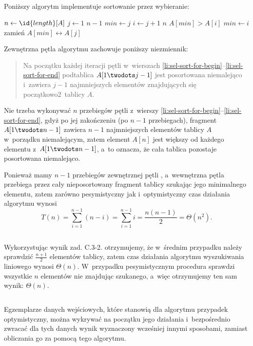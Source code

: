 \subsection{} %
Poniższy algorytm implementuje sortowanie przez wybieranie:
\begin{codebox}
\li	$n\gets \id{length}[A]$
\li	\For $j\gets 1$ \To $n-1$ \label{li:sel-sort-for-begin}
\li		\Do
			$min\gets j$
\li			\For $i\gets j+1$ \To $n$
\li				\Do
					\If $A[min]>A[i]$
\li						\Then
							$min\gets i$
						\End
				\End
\li			zamień $A[min]\leftrightarrow A[j]$
		\End \label{li:sel-sort-for-end}
\end{codebox}
Zewnętrzna pętla algorytmu zachowuje poniższy niezmiennik:
\begin{quote}
Na początku każdej iteracji pętli  w~wierszach \ref{li:sel-sort-for-begin}--\ref{li:sel-sort-for-end} podtablica $A[1\twodots j-1]$ jest posortowana niemalejąco i~zawiera $j-1$ najmniejszych elementów znajdujących się początkowo2~tablicy $A$.
\end{quote}

Nie trzeba wykonywać $n$ przebiegów pętli  z~wierszy \ref{li:sel-sort-for-begin}--\ref{li:sel-sort-for-end}, gdyż po jej zakończeniu (po $n-1$ przebiegach), fragment $A[1\twodots n-1]$ zawiera $n-1$ najmniejszych elementów tablicy $A$ w~porządku niemalejącym, zatem element $A[n]$ jest większy od każdego elementu z~$A[1\twodots n-1]$, a~to oznacza, że cała tablica pozostaje posortowana niemalejąco.

Ponieważ mamy $n-1$ przebiegów zewnętrznej pętli , a~wewnętrzna pętla  przebiega przez cały nieposortowany fragment tablicy szukając jego minimalnego elementu, zatem zarówno pesymistyczny jak i~optymistyczny czas działania algorytmu wynosi
\[
	T(n) = \sum_{i=1}^{n-1}(n-i) = \sum_{i=1}^{n-1}i = \frac{n(n-1)}{2} = \Theta(n^2).
\]

\subsection{} %
Wykorzystując wynik zad. C.3-2. otrzymujemy, że w~średnim przypadku należy sprawdzić $\frac{n+1}{2}$ elementów tablicy, zatem czas działania algorytmu wyszukiwania liniowego wynosi $\Theta(n)$. W~przypadku pesymistycznym procedura sprawdzi wszystkie $n$ elementów nie znajdując szukanego, a~więc otrzymujemy ten sam wynik: $\Theta(n)$.

\subsection{} %
Egzemplarze danych wejściowych, które stanowią dla algorytmu przypadek optymistyczny, można wykrywać na początku jego działania i~bezpośrednio zwracać dla tych danych wynik wyznaczony wcześniej innymi sposobami, zamiast obliczania go za pomocą tego algorytmu.

